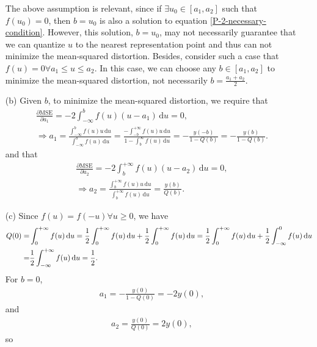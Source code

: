 \documentclass{assignment}
\begin{document}
\begin{sol}
\begin{itemize}
        The above assumption is relevant, since if $\exists u_0\in[a_1,a_2]$ such that $f(u_0)=0$, then $b=u_0$ is also a solution to equation \eqref{P-2-necessary-condition}. However, this solution, $b=u_0$, may not necessarily guarantee that we can quantize $u$ to the nearest representation point and thus can not minimize the mean-squared distortion. Besides, consider such a case that $f(u)=0\forall a_1\leq u\leq a_2$. In this case, we can choose any $b\in[a_1,a_2]$ to minimize the mean-squared distortion, not necessarily $b=\frac{a_1+a_2}{2}$.
        \item[(b)] Given $b$, to minimize the mean-squared distortion, we require that
        \begin{gather}
            \frac{\partial\text{MSE}}{\partial a_1}=-2\int_{-\infty}^bf(u)(u-a_1)\,\mathrm{d}u=0,\\
            \Longrightarrow a_1=\frac{\int_{-\infty}^bf(u)u\,\mathrm{d}u}{\int_{-\infty}^bf(u)\,\mathrm{d}u}=\frac{-\int_{-b}^{+\infty}f(u)u\,\mathrm{d}u}{1-\int_b^{\infty}f(u)\,\mathrm{d}u}=-\frac{y(-b)}{1-Q(b)}=-\frac{y(b)}{1-Q(b)}.
        \end{gather}
        and that
        \begin{gather}
            \frac{\partial\text{MSE}}{\partial a_2}=-2\int_b^{+\infty}f(u)(u-a_2)\,\mathrm{d}u=0,\\
            \Longrightarrow a_2=\frac{\int_b^{+\infty}f(u)u\,\mathrm{d}u}{\int_b^{+\infty}f(u)\,\mathrm{d}u}=\frac{y(b)}{Q(b)}.
        \end{gather}
        \item[(c)] Since $f(u)=f(-u)\forall u\geq 0$, we have
        \begin{align}
            \notag Q(0)=&\int_0^{+\infty}f(u)\,\mathrm{d}u=\frac{1}{2}\int_0^{+\infty}f(u)\,\mathrm{d}u+\frac{1}{2}\int_0^{+\infty}f(u)\,\mathrm{d}u=\frac{1}{2}\int_0^{+\infty}f(u)\,\mathrm{d}u+\frac{1}{2}\int_{-\infty}^0f(u)\,\mathrm{d}u\\
            =&\frac{1}{2}\int_{-\infty}^{+\infty}f(u)\,\mathrm{d}u=\frac{1}{2}.
        \end{align}
        For $b=0$,
        \begin{align}
            a_1=-\frac{y(0)}{1-Q(0)}=-2y(0),
        \end{align}
        and
        \begin{align}
            a_2=\frac{y(0)}{Q(0)}=2y(0),
        \end{align}
        so
        \begin{align}

\end{align}
\end{itemize}
\end{sol}
\end{document}
